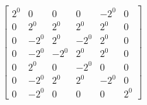 \documentclass{article}%
\begin{document}
\[\left[\begin{matrix}2^{0} & 0 & 0 & 0 & - 2^{0} & 0\\0 & 2^{0} & 2^{0} & 2^{0} & 2^{0} & 0\\0 & - 2^{0} & 2^{0} & - 2^{0} & 2^{0} & 0\\0 & - 2^{0} & - 2^{0} & 2^{0} & 2^{0} & 0\\0 & 2^{0} & 0 & - 2^{0} & 0 & 0\\0 & - 2^{0} & 2^{0} & 2^{0} & - 2^{0} & 0\\0 & - 2^{0} & 0 & 0 & 0 & 2^{0}\end{matrix}\right]%
\]%
\end{document}

